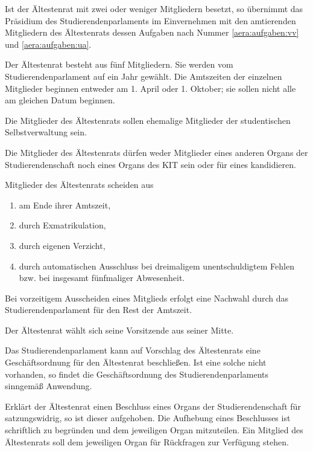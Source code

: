 \begin{contract}
Ist der Ältestenrat mit zwei oder weniger Mitgliedern besetzt, so übernimmt das Präsidium des Studierendenparlaments im Einvernehmen mit den amtierenden Mitgliedern des Ältestenrats dessen Aufgaben nach  Nummer \ref{aera:aufgaben:vv} und \ref{aera:aufgaben:ua}.



Der Ältestenrat besteht aus fünf Mitgliedern. Sie werden vom Studierendenparlament auf ein Jahr gewählt. Die Amtszeiten der einzelnen Mitglieder beginnen entweder am 1. April oder 1. Oktober; sie sollen nicht alle am gleichen Datum beginnen.

Die Mitglieder des Ältestenrats sollen ehemalige Mitglieder der studentischen Selbstverwaltung sein.

Die Mitglieder des Ältestenrats dürfen weder Mitglieder eines anderen Organs der Studierendenschaft noch eines Organs des KIT sein oder für eines kandidieren.

Mitglieder des Ältestenrats scheiden aus
  \begin{enumerate}
  \item am Ende ihrer Amtszeit,
  \item durch Exmatrikulation,
  \item durch eigenen Verzicht,
  \item durch automatischen Ausschluss bei dreimaligem unentschuldigtem Fehlen bzw. bei insgesamt fünfmaliger Abwesenheit. 
  \end{enumerate}
Bei vorzeitigem Ausscheiden eines Mitglieds erfolgt eine Nachwahl durch das Studierendenparlament für den Rest der Amtszeit.



Der Ältestenrat wählt sich seine Vorsitzende aus seiner Mitte.

Das Studierendenparlament kann auf Vorschlag des Ältestenrats eine Geschäftsordnung für den Ältestenrat beschließen. Ist eine solche nicht vorhanden, so findet die Ge\-schäfts\-ord\-nung des Studierendenparlaments sinngemäß Anwendung.



Erklärt der Ältestenrat einen Beschluss eines Organs der Studierendenschaft für satzungswidrig, so ist dieser aufgehoben. Die Aufhebung eines Beschlusses ist schriftlich zu begründen und dem jeweiligen Organ mitzuteilen. Ein Mitglied des Ältestenrats soll dem jeweiligen Organ für Rückfragen zur Verfügung stehen.


\end{contract}
